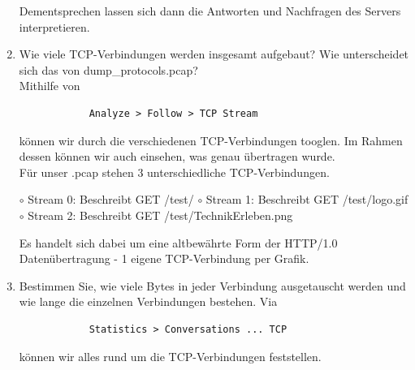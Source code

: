 \documentclass[11pt]{article}
\begin{document}
\begin{enumerate}[\thesection .1]
        Dementsprechen lassen sich dann die Antworten und Nachfragen des Servers interpretieren.

        \item Wie viele TCP-Verbindungen werden insgesamt aufgebaut? Wie unterscheidet sich das von dump\_protocols.pcap?\\
        Mithilfe von
        \begin{verbatim}
            Analyze > Follow > TCP Stream
        \end{verbatim}
        können wir durch die verschiedenen TCP-Verbindungen tooglen. Im Rahmen dessen können wir auch einsehen, was genau übertragen wurde.\\
        Für unser .pcap stehen 3 unterschiedliche TCP-Verbindungen.
        \begin{addmargin}[1em]{1em}
            $\circ$ Stream 0: Beschreibt GET /test/
            $\circ$ Stream 1: Beschreibt GET /test/logo.gif
            $\circ$ Stream 2: Beschreibt GET /test/TechnikErleben.png
        \end{addmargin}
        Es handelt sich dabei um eine altbewährte Form der HTTP/1.0 Datenübertragung - 1 eigene TCP-Verbindung per Grafik.

        \item Bestimmen Sie, wie viele Bytes in jeder Verbindung ausgetauscht werden und wie lange die einzelnen Verbindungen bestehen.
        Via
        \begin{verbatim}
            Statistics > Conversations ... TCP
        \end{verbatim}
        können wir alles rund um die TCP-Verbindungen feststellen.
    \end{enumerate}
\end{document}
